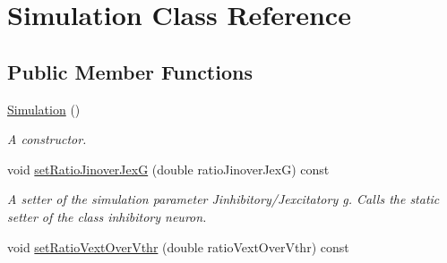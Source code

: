 \hypertarget{classSimulation}{\section{Simulation Class Reference}
\label{classSimulation}
}
\subsection*{Public Member Functions}
\begin{DoxyCompactItemize}
\item 
\hypertarget{classSimulation_a5b224cc5b36bcc8eb29689aff223de41}{\hyperlink{classSimulation_a5b224cc5b36bcc8eb29689aff223de41}{Simulation} ()}\label{classSimulation_a5b224cc5b36bcc8eb29689aff223de41}

\begin{DoxyCompactList}\small\item\em A constructor. \end{DoxyCompactList}\item 
\hypertarget{classSimulation_a73206723f84956e7d54766cec6286a1f}{void \hyperlink{classSimulation_a73206723f84956e7d54766cec6286a1f}{set\-Ratio\-Jinover\-Jex\-G} (double ratio\-Jinover\-Jex\-G) const }\label{classSimulation_a73206723f84956e7d54766cec6286a1f}

\begin{DoxyCompactList}\small\item\em A setter of the simulation parameter Jinhibitory/\-Jexcitatory g. Calls the static setter of the class inhibitory neuron. \end{DoxyCompactList}\item 
\hypertarget{classSimulation_a1d1100a36280bd45f426c82545f926bc}{void \hyperlink{classSimulation_a1d1100a36280bd45f426c82545f926bc}{set\-Ratio\-Vext\-Over\-Vthr} (double ratio\-Vext\-Over\-Vthr) const }\label{classSimulation_a1d1100a36280bd45f426c82545f926bc}


\end{DoxyCompactItemize}
